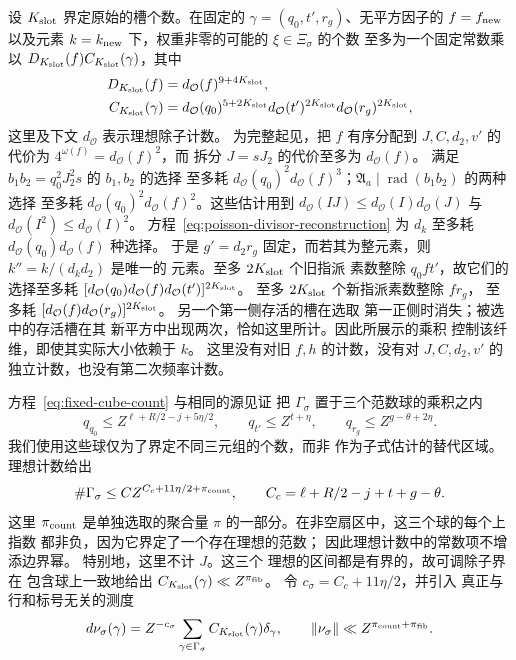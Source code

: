 设 \(K_{\rm slot}\) 界定原始的槽个数。在固定的
\(\gamma=(q_0,t',r_g)\)、无平方因子的 \(f=f_{\rm new}\) 以及元素
\(k=k_{\rm new}\) 下，权重非零的可能的 \(\xi\in\Xi_\sigma\) 的个数
至多为一个固定常数乘以
\(D_{K_{\rm slot}}(f)C_{K_{\rm slot}}(\gamma)\)，其中
\begin{equation}\label{eq:inverse-new-fibre}
 \begin{split}
 D_{K_{\rm slot}}(f)&=d_{\mathcal O}(f)^{9+4K_{\rm slot}},\\
 C_{K_{\rm slot}}(\gamma)&=
 d_{\mathcal O}(q_0)^{5+2K_{\rm slot}}
 d_{\mathcal O}(t')^{2K_{\rm slot}}
 d_{\mathcal O}(r_g)^{2K_{\rm slot}},
 \end{split}
\end{equation}
这里及下文 \(d_{\mathcal O}\) 表示理想除子计数。
为完整起见，把 \(f\) 有序分配到
\(J,C,d_2,v'\) 的代价为 \(4^{\omega(f)}=d_{\mathcal O}(f)^2\)，而
拆分 \(J=sJ_2\) 的代价至多为 \(d_{\mathcal O}(f)\)。
满足 \(b_1b_2=q_0^2J_2^2s\) 的 \(b_1,b_2\) 的选择
至多耗
\(d_{\mathcal O}(q_0)^2d_{\mathcal O}(f)^3\)；\(\mathfrak A_a\mid\operatorname{rad}(b_1b_2)\) 的两种选择
至多耗
\(d_{\mathcal O}(q_0)^2d_{\mathcal O}(f)^2\)。这些估计用到
\(d_{\mathcal O}(IJ)\le d_{\mathcal O}(I)d_{\mathcal O}(J)\) 与
\(d_{\mathcal O}(I^2)\le d_{\mathcal O}(I)^2\)。
方程~\eqref{eq:poisson-divisor-reconstruction} 为 \(d_k\) 至多耗
\(d_{\mathcal O}(q_0)d_{\mathcal O}(f)\) 种选择。
于是 \(g'=d_2r_g\) 固定，而若其为整元素，则 \(k''=k/(d_kd_2)\) 是唯一的
元素。至多 \(2K_{\rm slot}\) 个旧指派
素数整除 \(q_0ft'\)，故它们的选择至多耗
\([d_{\mathcal O}(q_0)d_{\mathcal O}(f)d_{\mathcal O}(t')]^{2K_{\rm slot}}\)。
至多 \(2K_{\rm slot}\) 个新指派素数整除 \(fr_g\)，
至多耗
\([d_{\mathcal O}(f)d_{\mathcal O}(r_g)]^{2K_{\rm slot}}\)。
另一个第一侧存活的槽在选取
第一正侧时消失；被选中的存活槽在其
新平方中出现两次，恰如这里所计。因此所展示的乘积
控制该纤维，即使其实际大小依赖于 \(k\)。
这里没有对旧 \(f,h\) 的计数，没有对
\(J,C,d_2,v'\) 的独立计数，也没有第二次频率计数。

方程~\eqref{eq:fixed-cube-count} 与相同的源见证
把 \(\Gamma_\sigma\) 置于三个范数球的乘积之内
\[
 q_{q_0}\le Z^{\ell+R/2-j+5\eta/2},\qquad
 q_{t'}\le Z^{t+\eta},\qquad q_{r_g}\le Z^{g-\theta+2\eta}.
\]
我们使用这些球仅为了界定不同三元组的个数，而非
作为子式估计的替代区域。理想计数给出
\begin{equation}\label{eq:canonical-fixed-count}
 \#\Gamma_\sigma\le C Z^{C_c+11\eta/2+\pi_{\rm count}},\qquad
 C_c=\ell+R/2-j+t+g-\theta.
\end{equation}
这里 \(\pi_{\rm count}\) 是单独选取的聚合量
\(\pi\) 的一部分。在非空扇区中，这三个球的每个上指数
都非负，因为它界定了一个存在理想的范数；
因此理想计数中的常数项不增添边界幂。
特别地，这里不计 \(J\)。这三个
理想的区间都是有界的，故可调除子界在
包含球上一致地给出
\(C_{K_{\rm slot}}(\gamma)\ll Z^{\pi_{\rm fib}}\)。
令 \(c_\sigma=C_c+11\eta/2\)，并引入
真正与行和标号无关的测度
\begin{equation}\label{eq:inverse-normalized-triples}
 d\nu_\sigma(\gamma)=Z^{-c_\sigma}
 \sum_{\gamma\in\Gamma_\sigma}C_{K_{\rm slot}}(\gamma)\delta_\gamma,
 \qquad \|\nu_\sigma\|\ll Z^{\pi_{\rm count}+\pi_{\rm fib}}.
\end{equation}

